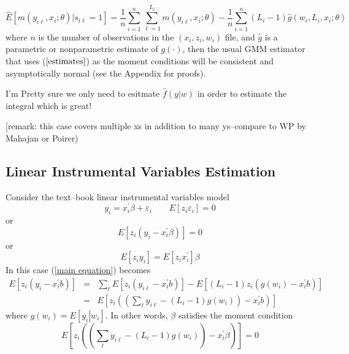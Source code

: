 \documentclass[12pt]{article}
\newcommand{\meanN}{\frac{1}{n}\sum_{i=1}^n}
\newcommand{\sumL}{\sum_{\ell=1}^{L_i}}
\begin{document}
\begin{equation} \hat{E}\left[m(y_{i\ell}, x_i; \theta) | s_{i\ell} =1\right] = \meanN \sumL m(y_{i\ell}, x_i; \theta) -  \meanN(L_i - 1) \hat{g}(w_i, L_i, x_i; \theta) \label{estimates} \end{equation} 
where $n$ is the number of observations in the $(x_i, z_i, w_i)$ file, and $\hat{g}$ is a parametric or nonparametric estimate of $g(\cdot)$, then the usual GMM estimator that uses ($\ref{estimates}$) as the moment conditions will be consistent and asymptotically normal (see the Appendix for proofs).   


I'm Pretty sure we only need to esitmate $\hat{f}(y | w) $ in order to estimate the integral which is great! 


[remark: this case covers multiple xs in addition to many ys--compare to WP
by Mahajan or Poirer)

\subsection{Linear Instrumental Variables Estimation\label{Lin IV}}

Consider the text--book linear instrumental variables model
\begin{equation*}
y_{i}=x_{i}^{\prime }\beta +\varepsilon _{i}\qquad E\left[ z_{i}\varepsilon
_{i}\right] =0
\end{equation*}%
or%
\begin{equation}
E\left[ z_{i}\left( y_{i}-x_{i}^{\prime }\beta \right) \right] =0
\label{moment condition}
\end{equation}%
or%
\begin{equation*}
E\left[ z_{i}y_{i}\right] =E\left[ z_{i}x_{i}^{\prime }\right] \beta
\end{equation*}%
In this case (\ref{main equation}) becomes%
\begin{eqnarray*}
E\left[ z_{i}\left( y_{i}-x_{i}^{\prime }b\right) \right] &=&\sum_{\ell }E%
\left[ z_{i}\left( y_{i\ell }-x_{i}^{\prime }b\right) \right] -E\left[
\left( L_{i}-1\right) z_{i}\left( g\left( w_{i}\right) -x_{i}^{\prime
}b\right) \right] \\
&=&E\left[ z_{i}\left( \left( \sum_{\ell }y_{i\ell }-\left( L_{i}-1\right)
g\left( w_{i}\right) \right) -x_{i}^{\prime }b\right) \right]
\end{eqnarray*}%
where $g\left( w_{i}\right) =E\left[ \left. y_{i}\right\vert w_{i}\right] $.
In other words, $\beta $ satisfies the moment condition
\begin{equation}
E\left[ z_{i}\left( \left( \sum_{\ell }y_{i\ell }-\left( L_{i}-1\right)
g\left( w_{i}\right) \right) -x_{i}^{\prime }\beta \right) \right] =0
\label{momcon1}
\end{equation}
\end{document}
